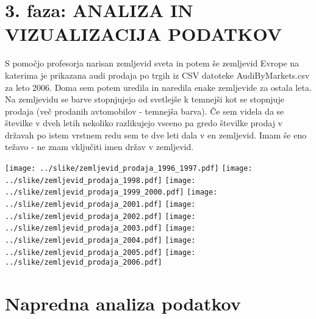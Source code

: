 \documentclass[11pt,a4paper]{article}
\begin{document}
\section{3. faza: ANALIZA IN VIZUALIZACIJA PODATKOV}
S pomočjo profesorja narisan zemljevid sveta in potem še zemljevid Evrope na katerima je prikazana audi prodaja po trgih iz CSV datoteke AudiByMarkets.csv za leto 2006. Doma sem potem uredila in naredila enake zemljevide za ostala leta. Na zemljevidu se barve stopnjujejo od svetlejše k temnejši kot se stopnjuje prodaja (več prodanih avtomobilov - temnejša barva). Če sem videla da se številke v dveh letih nekoliko razlikujejo vseeno pa gredo številke prodaj v državah po istem vrstnem redu sem te dve leti dala v en zemljevid. Imam še eno težavo - ne znam vključiti imen držav v zemljevid.

\texttt{[image: ../slike/zemljevid\_prodaja\_1996\_1997.pdf]}
\texttt{[image: ../slike/zemljevid\_prodaja\_1998.pdf]}
\texttt{[image: ../slike/zemljevid\_prodaja\_1999\_2000.pdf]}
\texttt{[image: ../slike/zemljevid\_prodaja\_2001.pdf]}
\texttt{[image: ../slike/zemljevid\_prodaja\_2002.pdf]}
\texttt{[image: ../slike/zemljevid\_prodaja\_2003.pdf]}
\texttt{[image: ../slike/zemljevid\_prodaja\_2004.pdf]}
\texttt{[image: ../slike/zemljevid\_prodaja\_2005.pdf]}
\texttt{[image: ../slike/zemljevid\_prodaja\_2006.pdf]}

\section{Napredna analiza podatkov}

\end{document}
